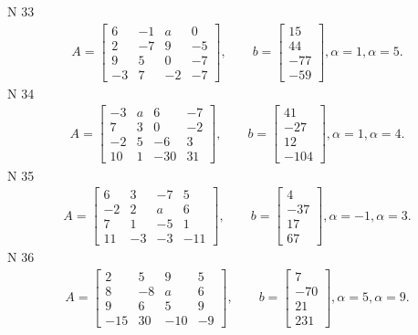 \documentclass[11pt]{report}
\begin{document}
N 33
\begin{align*}
 A = \left[\begin{matrix}6 & -1 & a & 0\\2 & -7 & 9 & -5\\9 & 5 & 0 & -7\\-3 & 7 & -2 & -7\end{matrix}\right],
    \qquad b = \left[\begin{matrix}15\\44\\-77\\-59\end{matrix}\right], \alpha = 1, \alpha = 5. 
 \end{align*}
N 34
\begin{align*}
 A = \left[\begin{matrix}-3 & a & 6 & -7\\7 & 3 & 0 & -2\\-2 & 5 & -6 & 3\\10 & 1 & -30 & 31\end{matrix}\right],
    \qquad b = \left[\begin{matrix}41\\-27\\12\\-104\end{matrix}\right], \alpha = 1, \alpha = 4. 
 \end{align*}
N 35
\begin{align*}
 A = \left[\begin{matrix}6 & 3 & -7 & 5\\-2 & 2 & a & 6\\7 & 1 & -5 & 1\\11 & -3 & -3 & -11\end{matrix}\right],
    \qquad b = \left[\begin{matrix}4\\-37\\17\\67\end{matrix}\right], \alpha = -1, \alpha = 3. 
 \end{align*}
N 36
\begin{align*}
 A = \left[\begin{matrix}2 & 5 & 9 & 5\\8 & -8 & a & 6\\9 & 6 & 5 & 9\\-15 & 30 & -10 & -9\end{matrix}\right],
    \qquad b = \left[\begin{matrix}7\\-70\\21\\231\end{matrix}\right], \alpha = 5, \alpha = 9. 
 \end{align*}
\end{document}
